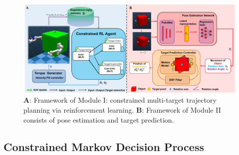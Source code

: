 \documentclass{article}
\begin{document}
    

\begin{figure}[t]
  \centering
  \includegraphics[width=\hsize]{figs/Fig2.pdf}
  \caption{	\textbf{A}: Framework of Module I: constrained multi-target trajectory planning via reinforcement learning. \textbf{B}: Framework of Module II consists of pose estimation and target prediction. }
  \label{fig2}
\end{figure} 


\subsection{Constrained Markov Decision Process}
\end{document}
